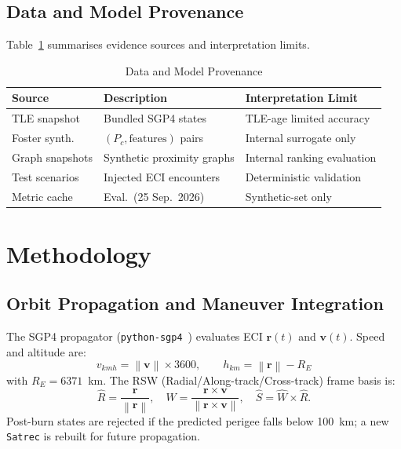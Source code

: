 \documentclass[conference]{IEEEtran}
\newcommand{\norm}[1]{\left\|#1\right\|}
\newcommand{\bvec}[1]{\mathbf{#1}}
\newcommand{\Pc}{P_c}
\begin{document}
\subsection{Data and Model Provenance}

Table~\ref{tab:provenance} summarises evidence sources and interpretation limits.

\begin{table}[h]
\caption{Data and Model Provenance}
\label{tab:provenance}
\centering
\footnotesize
\begin{tabular}{@{}p{1.5cm}p{2.8cm}p{2.8cm}@{}}
\toprule
\textbf{Source} & \textbf{Description} & \textbf{Interpretation Limit} \\
\midrule
TLE snapshot    & Bundled SGP4 states          & TLE-age limited accuracy \\
Foster synth.   & $(\Pc,\text{features})$ pairs & Internal surrogate only \\
Graph snapshots & Synthetic proximity graphs    & Internal ranking evaluation \\
Test scenarios  & Injected ECI encounters       & Deterministic validation \\
Metric cache    & Eval.\ (25 Sep.\ 2026)       & Synthetic-set only \\
\bottomrule
\end{tabular}
\end{table}

\section{Methodology}
\label{sec:method}

\subsection{Orbit Propagation and Maneuver Integration}

The SGP4 propagator (\texttt{python-sgp4}~\cite{vallado2006}) evaluates ECI
$\bvec{r}(t)$ and $\bvec{v}(t)$. Speed and altitude are:
%
\begin{equation}
  v_{kmh} = \norm{\bvec{v}} \times 3600, \qquad
  h_{km}  = \norm{\bvec{r}} - R_E
\end{equation}
%
with $R_E = 6371$~km. The RSW (Radial/Along-track/Cross-track) frame basis is:
%
\begin{equation}
  \hat{R} = \frac{\bvec{r}}{\norm{\bvec{r}}},\quad
  \hat{W} = \frac{\bvec{r}\times\bvec{v}}{\norm{\bvec{r}\times\bvec{v}}},\quad
  \hat{S} = \hat{W}\times\hat{R}.
\end{equation}
%
Post-burn states are rejected if the predicted perigee falls below 100~km; a new
\texttt{Satrec} is rebuilt for future propagation.
\end{document}
